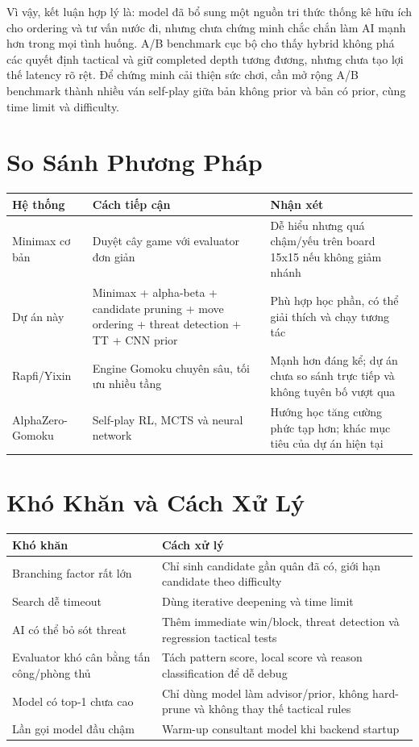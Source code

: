 \documentclass[12pt,a4paper]{article}
\begin{document}
Vì vậy, kết luận hợp lý là: model đã bổ sung một nguồn tri thức thống kê hữu ích cho ordering và tư vấn nước đi, nhưng chưa chứng minh chắc chắn làm AI mạnh hơn trong mọi tình huống. A/B benchmark cục bộ cho thấy hybrid không phá các quyết định tactical và giữ completed depth tương đương, nhưng chưa tạo lợi thế latency rõ rệt. Để chứng minh cải thiện sức chơi, cần mở rộng A/B benchmark thành nhiều ván self-play giữa bản không prior và bản có prior, cùng time limit và difficulty.

\section{So Sánh Phương Pháp}
\label{sec:comparison}

\begin{longtable}{p{}p{}p{}}
\toprule
\textbf{Hệ thống} & \textbf{Cách tiếp cận} & \textbf{Nhận xét} \\
\midrule
Minimax cơ bản & Duyệt cây game với evaluator đơn giản & Dễ hiểu nhưng quá chậm/yếu trên board 15x15 nếu không giảm nhánh \\
Dự án này & Minimax + alpha-beta + candidate pruning + move ordering + threat detection + TT + CNN prior & Phù hợp học phần, có thể giải thích và chạy tương tác \\
Rapfi/Yixin & Engine Gomoku chuyên sâu, tối ưu nhiều tầng & Mạnh hơn đáng kể; dự án chưa so sánh trực tiếp và không tuyên bố vượt qua \\
AlphaZero-Gomoku & Self-play RL, MCTS và neural network & Hướng học tăng cường phức tạp hơn; khác mục tiêu của dự án hiện tại \\
\bottomrule
\end{longtable}

\section{Khó Khăn và Cách Xử Lý}
\label{sec:difficulties}

\begin{longtable}{p{}p{}}
\toprule
\textbf{Khó khăn} & \textbf{Cách xử lý} \\
\midrule
Branching factor rất lớn & Chỉ sinh candidate gần quân đã có, giới hạn candidate theo difficulty \\
Search dễ timeout & Dùng iterative deepening và time limit \\
AI có thể bỏ sót threat & Thêm immediate win/block, threat detection và regression tactical tests \\
Evaluator khó cân bằng tấn công/phòng thủ & Tách pattern score, local score và reason classification để dễ debug \\
Model có top-1 chưa cao & Chỉ dùng model làm advisor/prior, không hard-prune và không thay thế tactical rules \\
Lần gọi model đầu chậm & Warm-up consultant model khi backend startup \\
\bottomrule
\end{longtable}
\end{document}
